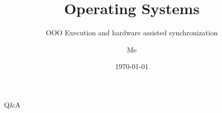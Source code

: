 \documentclass[12pt]{beamer}
\title{Operating Systems}
\subtitle{OOO Execution and hardware assisted synchronization}
\author{Me}
\date{\today}
\begin{document}
  \begin{frame}
    \titlepage
  \end{frame}

  
  
  

  \begin{frame}
  \begin{center}
  \Huge Q\&A
  \end{center}
  \end{frame}
\end{document}
